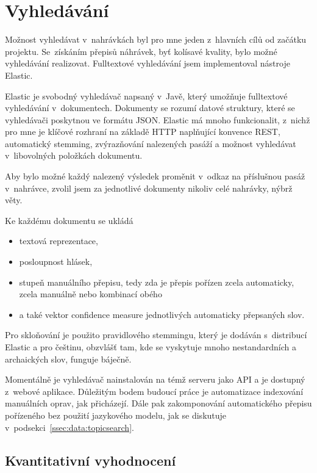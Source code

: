 \chapter{Vyhledávání}
\label{kap:vyhledavani}

Možnost vyhledávat v~nahrávkách byl pro mne jeden z~hlavních cílů od začátku
projektu. Se~získáním přepisů náhrávek, byť kolísavé kvality, bylo možné
vyhledávání realizovat.
Fulltextové vyhledávání jsem implementoval nástroje Elastic.

Elastic je svobodný vyhledávač napsaný v~Javě, který umožňuje fulltextové
vyhledávání v~dokumentech. Dokumenty se rozumí datové struktury, které se
vyhledávači poskytnou ve formátu JSON. Elastic má mnoho funkcionalit,
z~nichž pro mne je klíčové rozhraní na základě HTTP naplňující konvence REST,
automatický stemming, zvýrazňování nalezených pasáží a možnost vyhledávat
v~libovolných položkách dokumentu.

Aby bylo možné každý nalezený výsledek proměnit v~odkaz na příslušnou pasáž
v~nahrávce, zvolil jsem za jednotlivé dokumenty nikoliv celé nahrávky, nýbrž
věty.

Ke každému dokumentu se ukládá
\begin{itemize}
\item{textová reprezentace,}
\item{posloupnost hlásek,}
\item{stupeň
manuálního přepisu, tedy zda je přepis pořízen zcela automaticky, zcela manuálně
nebo kombinací obého}
\item{a také vektor confidence measure jednotlivých automaticky přepsaných slov.}
\end{itemize}

Pro skloňování je použito pravidlového stemmingu, který je dodáván s~distribucí
Elastic a pro češtinu, obzvlášť tam, kde se vyskytuje mnoho
nestandardních a archaických slov, funguje báječně.

Momentálně je vyhledávač nainstalován na témž serveru jako API a je dostupný
z~webové aplikace. Důležitým bodem budoucí práce je automatizace indexování
manuálních oprav, jak přicházejí. Dále pak zakomponování automatického přepisu
pořízeného bez použití jazykového modelu, jak se diskutuje
v~podsekci~\ref{ssec:data:topicsearch}.

\section{Kvantitativní vyhodnocení}

